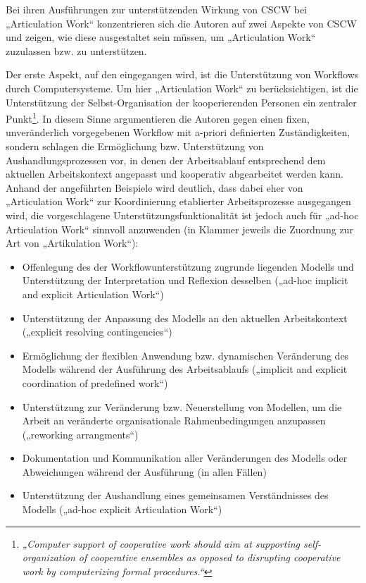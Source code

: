 Bei ihren Ausführungen zur unterstützenden Wirkung von \gls{CSCW} bei „Articulation Work“ konzentrieren sich die Autoren auf zwei Aspekte von \gls{CSCW} und zeigen, wie diese ausgestaltet sein müssen, um „Articulation Work“ zuzulassen bzw. zu unterstützen. 

Der erste Aspekt, auf den eingegangen wird, ist die Unterstützung von Workflows durch Computersysteme. Um hier „Articulation Work“ zu berücksichtigen, ist die Unterstützung der Selbst-Organisation der kooperierenden Personen ein zentraler Punkt\footnote{\emph{„Computer support of cooperative work should aim at supporting self-organization of cooperative ensembles as opposed to disrupting cooperative work by computerizing formal procedures.“}\citep[][S. 17]{Schmidt92}}. In diesem Sinne argumentieren die Autoren gegen einen fixen, unveränderlich vorgegebenen Workflow mit a-priori definierten Zuständigkeiten, sondern schlagen die Ermöglichung bzw. Unterstützung von Aushandlungsprozessen vor, in denen der Arbeitsablauf entsprechend dem aktuellen Arbeitskontext angepasst und kooperativ abgearbeitet werden kann. Anhand der angeführten Beispiele wird deutlich, dass dabei eher von „Articulation Work“ zur Koordinierung etablierter Arbeitsprozesse ausgegangen wird, die vorgeschlagene Unterstützungsfunktionalität ist jedoch auch für „ad-hoc Articulation Work“ sinnvoll anzuwenden (in Klammer jeweils die Zuordnung zur Art von „Artikulation Work“):
\begin{itemize}
	\item Offenlegung des der Workflowunterstützung zugrunde liegenden Modells und Unterstützung der Interpretation und Reflexion desselben („ad-hoc implicit and explicit Articulation Work“)
	\item Unterstützung der Anpassung des Modells an den aktuellen Arbeitskontext („explicit resolving contingencies“)
	\item Ermöglichung der flexiblen Anwendung bzw. dynamischen Veränderung des Modells während der Ausführung des Arbeitsablaufs („implicit and explicit coordination of predefined work“)
	\item Unterstützung zur Veränderung bzw. Neuerstellung von Modellen, um die Arbeit an veränderte organisationale Rahmenbedingungen anzupassen („reworking arrangments“)
	\item Dokumentation und Kommunikation aller Veränderungen des Modells oder Abweichungen während der Ausführung (in allen Fällen)
	\item Unterstützung der Aushandlung eines gemeinsamen Verständnisses des Modells („ad-hoc explicit Articulation Work“)
\end{itemize}

